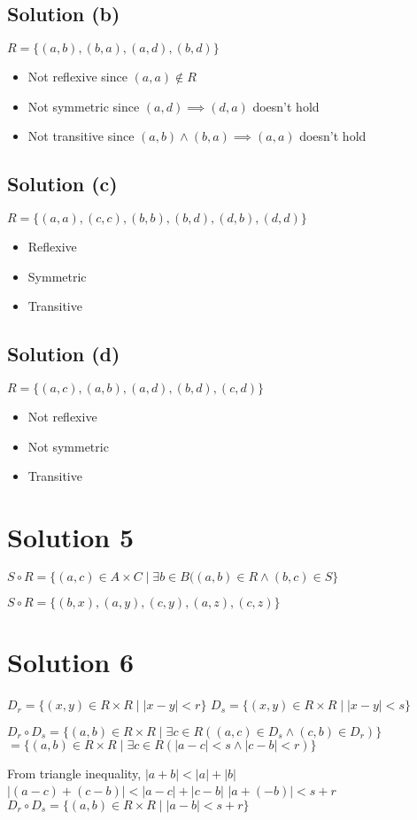 \documentclass{article}
\begin{document}
\subsection{Solution (b)}

$R = \{(a,b), (b,a), (a,d), (b,d)\}$

\begin{itemize}
\item Not reflexive since $(a,a) \notin R$
\item Not symmetric since $(a,d) \implies (d,a)$ doesn't hold
\item Not transitive since $(a,b) \land (b,a) \implies (a,a)$ doesn't hold
\end{itemize}

\subsection{Solution (c)}

$R = \{(a,a), (c,c), (b,b), (b,d), (d,b), (d,d)\}$

\begin{itemize}
\item Reflexive
\item Symmetric
\item Transitive
\end{itemize}

\subsection{Solution (d)}

$R = \{(a,c), (a,b), (a,d), (b,d), (c,d)\}$

\begin{itemize}
\item Not reflexive
\item Not symmetric
\item Transitive
\end{itemize}

\section{Solution 5}

$S \circ R = \{(a,c) \in A \times C \mid \exists b \in B((a,b) \in R
\land (b,c) \in S\}$

$S \circ R = \{(b,x), (a,y), (c,y), (a,z), (c,z)\}$

\section{Solution 6}

$ D_r = \{(x,y) \in R \times R \mid |x - y| < r \}$
$ D_s = \{(x,y) \in R \times R \mid |x - y| < s \}$

$ D_r \circ D_s = \{(a,b) \in R \times R \mid \exists c \in R((a,c)
\in D_s \land (c,b) \in D_r)\}$
$= \{(a,b) \in R \times R \mid \exists c \in R (|a - c| < s \land |c -
b| < r)\}$

From triangle inequality, $|a + b| < |a| + |b|$
$|(a-c) + (c-b)| < |a-c| + |c-b|$
$|a + (-b)| < s + r$
$ D_r \circ D_s = \{(a,b) \in R \times R \mid |a-b| < s + r\}$
\end{document}
